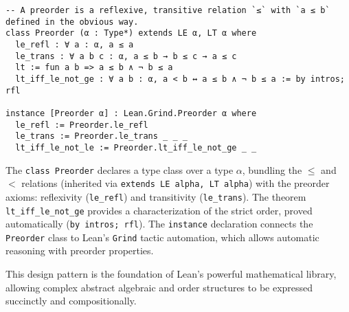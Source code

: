 \begin{lstlisting}[language=lean, caption=Preorder Type Class in Lean]
-- A preorder is a reflexive, transitive relation `≤` with `a ≤ b` defined in the obvious way.
class Preorder (α : Type*) extends LE α, LT α where
  le_refl : ∀ a : α, a ≤ a
  le_trans : ∀ a b c : α, a ≤ b → b ≤ c → a ≤ c
  lt := fun a b => a ≤ b ∧ ¬ b ≤ a
  lt_iff_le_not_ge : ∀ a b : α, a < b ↔ a ≤ b ∧ ¬ b ≤ a := by intros; rfl

instance [Preorder α] : Lean.Grind.Preorder α where
  le_refl := Preorder.le_refl
  le_trans := Preorder.le_trans _ _ _
  lt_iff_le_not_le := Preorder.lt_iff_le_not_ge _ _
\end{lstlisting}

  The \texttt{class Preorder} declares a type class over a type 
 \(\alpha\), bundling the \(\leq\) and \(<\) relations 
 (inherited via \texttt{extends LE alpha, LT alpha}) with the
  preorder axioms: reflexivity (\texttt{le\_refl}) and 
  transitivity (\texttt{le\_trans}).
  The theorem \texttt{lt\_iff\_le\_not\_ge} provides a characterization of the strict order, 
  proved automatically (\texttt{by intros; rfl}).
  The \texttt{instance} declaration connects the \texttt{Preorder} class to Lean’s \texttt{Grind} 
  tactic automation, which allows automatic reasoning with preorder properties.

This design pattern is the foundation of Lean’s powerful mathematical library, 
allowing complex abstract algebraic and order structures to be expressed succinctly and compositionally.


